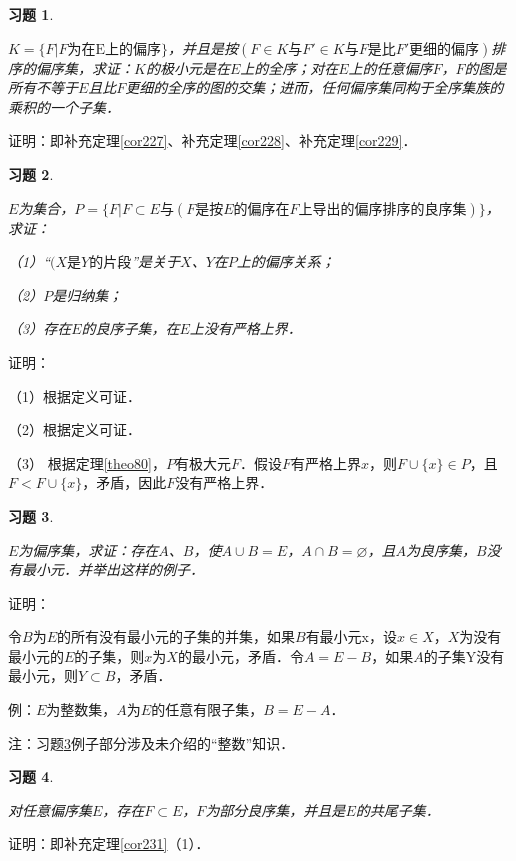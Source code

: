 \documentclass[12pt, a4paper, oneside]{book}
\newtheorem{exer}{习题}
\begin{document}
			\begin{exer}\label{exer101}
				\hfill\par
				$K=\{F|F\text{为在E上的偏序}\}$，并且是按$(F\in K\text{与}F'\in K\text{与}F\text{是比}F'\text{更细的偏序})$排序的偏序集，求证：$K$的极小元是在$E$上的全序；对在$E$上的任意偏序$F$，$F$的图是所有不等于$E$且比$F$更细的全序的图的交集；进而，任何偏序集同构于全序集族的乘积的一个子集．
			\end{exer}
			证明：即补充定理\ref{cor227}、补充定理\ref{cor228}、补充定理\ref{cor229}．
			
			\begin{exer}\label{exer102}
				\hfill\par
				$E$为集合，$P=\{F|F\subset E\text{与}(F\text{是按}E\text{的偏序在}F\text{上导出的偏序排序的良序集})\}$，求证：
				\par
				（1）“$(X\text{是}Y\text{的片段}$”是关于$X$、$Y$在$P$上的偏序关系；
				\par
				（2）$P$是归纳集；
				\par
				（3）存在$E$的良序子集，在$E$上没有严格上界．
			\end{exer}
			证明：
			\par
			（1）根据定义可证．
			\par
			（2）根据定义可证．
			\par
			（3）	根据定理\ref{theo80}，$P$有极大元$F$．假设$F$有严格上界$x$，则$F\cup\{x\}\in P$，且$F<F\cup\{x\}$，矛盾，因此$F$没有严格上界．
			
			\begin{exer}\label{exer103}
				\hfill\par
				$E$为偏序集，求证：存在$A$、$B$，使$A\cup B=E$，$A\cap B=\varnothing$，且$A$为良序集，$B$没有最小元．并举出这样的例子．
			\end{exer}
			证明：
			\par
			令$B$为$E$的所有没有最小元的子集的并集，如果$B$有最小元x，设$x\in X$，$X$为没有最小元的$E$的子集，则$x$为$X$的最小元，矛盾．令$A=E-B$，如果$A$的子集Y没有最小元，则$Y\subset B$，矛盾．
			\par
			例：$E$为整数集，$A$为$E$的任意有限子集，$B=E-A$．
			\par
			注：习题\ref{exer103}例子部分涉及未介绍的“整数”知识．
						
			\begin{exer}\label{exer104}
				\hfill\par
				对任意偏序集$E$，存在$F\subset E$，$F$为部分良序集，并且是$E$的共尾子集．
			\end{exer}
			证明：即补充定理\ref{cor231}（1）．
						
\end{document}
